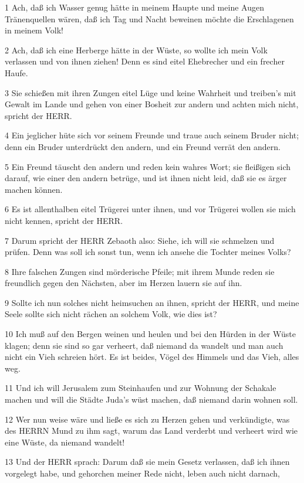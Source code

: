 \par 1 Ach, daß ich Wasser genug hätte in meinem Haupte und meine Augen Tränenquellen wären, daß ich Tag und Nacht beweinen möchte die Erschlagenen in meinem Volk!
\par 2 Ach, daß ich eine Herberge hätte in der Wüste, so wollte ich mein Volk verlassen und von ihnen ziehen! Denn es sind eitel Ehebrecher und ein frecher Haufe.
\par 3 Sie schießen mit ihren Zungen eitel Lüge und keine Wahrheit und treiben's mit Gewalt im Lande und gehen von einer Bosheit zur andern und achten mich nicht, spricht der HERR.
\par 4 Ein jeglicher hüte sich vor seinem Freunde und traue auch seinem Bruder nicht; denn ein Bruder unterdrückt den andern, und ein Freund verrät den andern.
\par 5 Ein Freund täuscht den andern und reden kein wahres Wort; sie fleißigen sich darauf, wie einer den andern betrüge, und ist ihnen nicht leid, daß sie es ärger machen können.
\par 6 Es ist allenthalben eitel Trügerei unter ihnen, und vor Trügerei wollen sie mich nicht kennen, spricht der HERR.
\par 7 Darum spricht der HERR Zebaoth also: Siehe, ich will sie schmelzen und prüfen. Denn was soll ich sonst tun, wenn ich ansehe die Tochter meines Volks?
\par 8 Ihre falschen Zungen sind mörderische Pfeile; mit ihrem Munde reden sie freundlich gegen den Nächsten, aber im Herzen lauern sie auf ihn.
\par 9 Sollte ich nun solches nicht heimsuchen an ihnen, spricht der HERR, und meine Seele sollte sich nicht rächen an solchem Volk, wie dies ist?
\par 10 Ich muß auf den Bergen weinen und heulen und bei den Hürden in der Wüste klagen; denn sie sind so gar verheert, daß niemand da wandelt und man auch nicht ein Vieh schreien hört. Es ist beides, Vögel des Himmels und das Vieh, alles weg.
\par 11 Und ich will Jerusalem zum Steinhaufen und zur Wohnung der Schakale machen und will die Städte Juda's wüst machen, daß niemand darin wohnen soll.
\par 12 Wer nun weise wäre und ließe es sich zu Herzen gehen und verkündigte, was des HERRN Mund zu ihm sagt, warum das Land verderbt und verheert wird wie eine Wüste, da niemand wandelt!
\par 13 Und der HERR sprach: Darum daß sie mein Gesetz verlassen, daß ich ihnen vorgelegt habe, und gehorchen meiner Rede nicht, leben auch nicht darnach,
